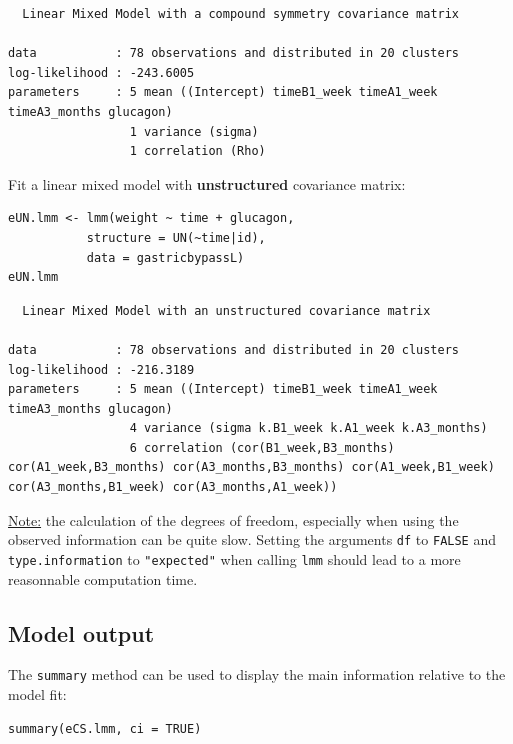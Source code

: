 \documentclass[12pt]{article}
\begin{document}
\begin{verbatim}
  Linear Mixed Model with a compound symmetry covariance matrix 
 
data           : 78 observations and distributed in 20 clusters 
log-likelihood : -243.6005
parameters     : 5 mean ((Intercept) timeB1_week timeA1_week timeA3_months glucagon) 
                 1 variance (sigma) 
                 1 correlation (Rho)
\end{verbatim}



\noindent Fit a linear mixed model with \textbf{unstructured} covariance matrix:
\lstset{language=r,label= ,caption= ,captionpos=b,numbers=none}
\begin{lstlisting}
eUN.lmm <- lmm(weight ~ time + glucagon,
	       structure = UN(~time|id),
	       data = gastricbypassL)
eUN.lmm
\end{lstlisting}

\begin{verbatim}
  Linear Mixed Model with an unstructured covariance matrix 
 
data           : 78 observations and distributed in 20 clusters 
log-likelihood : -216.3189
parameters     : 5 mean ((Intercept) timeB1_week timeA1_week timeA3_months glucagon) 
                 4 variance (sigma k.B1_week k.A1_week k.A3_months) 
                 6 correlation (cor(B1_week,B3_months) cor(A1_week,B3_months) cor(A3_months,B3_months) cor(A1_week,B1_week) cor(A3_months,B1_week) cor(A3_months,A1_week))
\end{verbatim}


\uline{Note:} the calculation of the degrees of freedom, especially when
using the observed information can be quite slow. Setting the
arguments \texttt{df} to \texttt{FALSE} and \texttt{type.information} to \texttt{"expected"} when
calling \texttt{lmm} should lead to a more reasonnable computation time.

\clearpage

\subsection{Model output}
\label{sec:orgf296028}

The \texttt{summary} method can be used to display the main information
relative to the model fit:
\lstset{language=r,label= ,caption= ,captionpos=b,numbers=none}
\begin{lstlisting}
summary(eCS.lmm, ci = TRUE)
\end{lstlisting}
\end{document}
